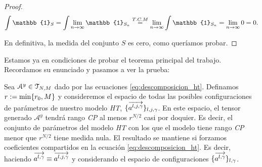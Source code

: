 \begin{proof}
    \begin{equation}
        \int \mathbb{1}_S = \int \lim_{n \to \infty} \mathbb{1}_{S_n} \encima{=}{T.C.M} \lim_{n \to \infty} \int \mathbb{1}_{S_n} = \lim_{n \to \infty} 0 = 0.
    \end{equation}

    En definitiva, la medida del conjunto $S$ es cero, como queríamos probar.

\end{proof}

Estamos ya en condiciones de probar el teorema principal del trabajo. Recordamos su enunciado y pasamos a ver la prueba:

\begin{teorema} \label{teorema:teorema_principal_especificacion}
    Sea $\mathcal{A}^y \in \mathcal{T}_{N, M}$ dado por las ecuaciones \eqref{eq:descomposicion_ht}. Definamos $r := \min \{ r_0, M \}$ y consideremos el espacio de todas las posibles configuraciones de parámetros de nuestro modelo \textit{HT}, $\{  \overrightarrow{a^{l, j, \gamma}} \}_{l, j, \gamma}$. En este espacio, el tensor generado $\mathcal{A}^y$ tendrá rango \textit{CP} al menos $r^{N/2}$ casi por doquier. Es decir, el conjunto de parámetros del modelo \textit{HT} con los que el modelo tiene rango \textit{CP} menor que $r^{N/2}$ tiene medida nula. El resultado se mantiene si forzamos coeficientes compartidos en la ecuación \eqref{eq:descomposicion_ht}. Es decir, haciendo $\overrightarrow{a^{l, \gamma}} \equiv \overrightarrow{a^{l, j, \gamma}}$ y considerando el espacio de configuraciones $\{ \overrightarrow{a^{l, \gamma}}  \}_{l, \gamma}$.
\end{teorema}


